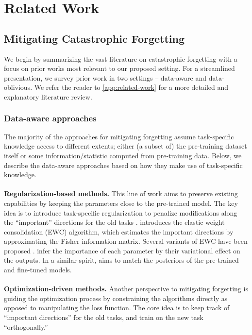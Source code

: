 \section{Related Work}
\label{sec:related-work}
\subsection{Mitigating Catastrophic Forgetting}
We begin by summarizing the vast literature on catastrophic forgetting with a focus on prior works most relevant to our proposed setting.
For a streamlined presentation, we survey prior work in two settings -- data-aware and data-oblivious. 
We refer the reader to \cref{app:related-work} for a more detailed and explanatory literature review. 

\subsubsection{Data-aware approaches}
The majority of the approaches for mitigating  
forgetting assume task-specific knowledge access to different extents; either (a subset of) the pre-training dataset itself or some information/statistic computed from pre-training data. Below, we describe the data-aware approaches based on how they make use of task-specific knowledge.
\\
\\
\textbf{Regularization-based methods.} This line of work aims to preserve existing capabilities by keeping the parameters close to the pre-trained model. The key idea is to introduce task-specific regularization to penalize modifications along the ``important'' directions for the old tasks 
\citep{ahn2019uncertainty}. 
\citet{kirkpatrick2016overcoming} introduces the elastic weight consolidation (EWC) algorithm, which estimates the important directions by approximating the Fisher information matrix. 
Several variants of EWC have been proposed \citep{schwarz2018progress, ritter2018online, Lee2020ContinualLW, liu2018rotate}. \citet{zenke2017continual, aljundi2018memory} infer the importance of each parameter by their variational effect on the outputs. In a similar spirit, \citet{lee2017overcoming} aims to match the posteriors of the pre-trained and fine-tuned models. 
\\
\\
\textbf{Optimization-driven methods.} Another perspective to mitigating forgetting is guiding the optimization process by constraining the algorithms directly as opposed to manipulating the loss function. 
The core idea is to keep track of \enquote{important directions} for the old tasks, and train on the new task \enquote{orthogonally.} 
